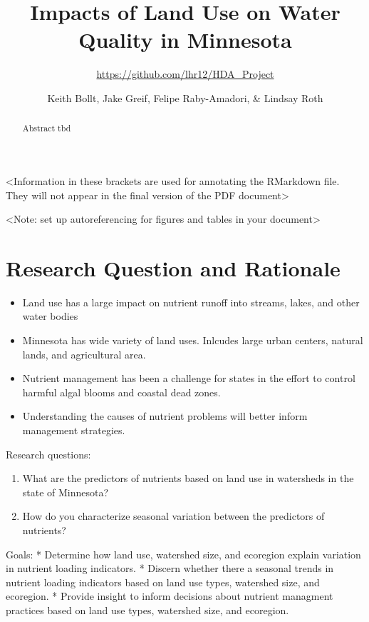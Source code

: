 \documentclass[12pt,]{article}
\title{Impacts of Land Use on Water Quality in Minnesota}
\subtitle{\url{https://github.com/lhr12/HDA_Project}}
\author{Keith Bollt, Jake Greif, Felipe Raby-Amadori, \& Lindsay Roth}
\date{}
\providecommand{\tightlist}{%
  \setlength{\itemsep}{0pt}\setlength{\parskip}{0pt}}
\begin{document}
\maketitle
\begin{abstract}
Abstract tbd
\end{abstract}

\textless{}Information in these brackets are used for annotating the
RMarkdown file. They will not appear in the final version of the PDF
document\textgreater{}

\newpage
\tableofcontents 
\newpage
\listoftables 
\newpage
\listoffigures 
\newpage

\textless{}Note: set up autoreferencing for figures and tables in your
document\textgreater{}

\hypertarget{research-question-and-rationale}{%
\section{Research Question and
Rationale}\label{research-question-and-rationale}}

\begin{itemize}
\tightlist
\item
  Land use has a large impact on nutrient runoff into streams, lakes,
  and other water bodies
\item
  Minnesota has wide variety of land uses. Inlcudes large urban centers,
  natural lands, and agricultural area.
\item
  Nutrient management has been a challenge for states in the effort to
  control harmful algal blooms and coastal dead zones.
\item
  Understanding the causes of nutrient problems will better inform
  management strategies.
\end{itemize}

Research questions:

\begin{enumerate}
\def\labelenumi{\arabic{enumi}.}
\item
  What are the predictors of nutrients based on land use in watersheds
  in the state of Minnesota?
\item
  How do you characterize seasonal variation between the predictors of
  nutrients?
\end{enumerate}

Goals: * Determine how land use, watershed size, and ecoregion explain
variation in nutrient loading indicators. * Discern whether there a
seasonal trends in nutrient loading indicators based on land use types,
watershed size, and ecoregion. * Provide insight to inform decisions
about nutrient managment practices based on land use types, watershed
size, and ecoregion.
\end{document}
